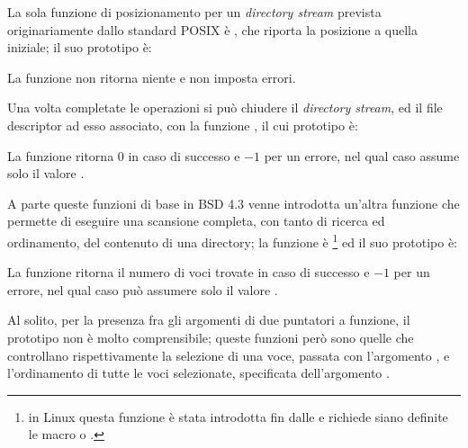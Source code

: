 La sola funzione di posizionamento per un \textit{directory stream} prevista
originariamente dallo standard POSIX è , che riporta la
posizione a quella iniziale; il suo prototipo è:

\begin{funcproto}{
}
{La funzione non ritorna niente e non imposta errori.}
\end{funcproto}

Una volta completate le operazioni si può chiudere il \textit{directory
  stream}, ed il file descriptor ad esso associato, con la funzione
, il cui prototipo è:

\begin{funcproto}{
}
{La funzione ritorna $0$ in caso di successo e $-1$ per un errore, nel qual
  caso  assume solo il valore .}
\end{funcproto}

A parte queste funzioni di base in BSD 4.3 venne introdotta un'altra funzione
che permette di eseguire una scansione completa, con tanto di ricerca ed
ordinamento, del contenuto di una directory; la funzione è
\footnote{in Linux questa funzione è stata introdotta fin dalle
   e richiede siano definite le macro  o
  .} ed il suo prototipo è:

\begin{funcproto}{
}
{La funzione ritorna il numero di voci trovate in caso di successo e $-1$ per
  un errore, nel qual caso  può assumere solo il valore
  .}
\end{funcproto}

Al solito, per la presenza fra gli argomenti di due puntatori a funzione, il
prototipo non è molto comprensibile; queste funzioni però sono quelle che
controllano rispettivamente la selezione di una voce, passata con
l'argomento , e l'ordinamento di tutte le voci selezionate,
specificata dell'argomento .

